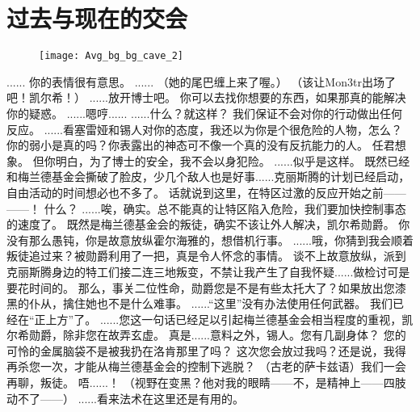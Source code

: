 \documentclass[openany]{book}
\begin{document}
\chapter{过去与现在的交会}
\begin{figure}[h]
    \centering
    \texttt{[image: Avg\_bg\_bg\_cave\_2]}
\end{figure}
\begin{dialogue}
     ......
     你的表情很有意思。
     ......
     （她的尾巴缠上来了喔。）
     （该让Mon3tr出场了吧！凯尔希！）
     ......放开博士吧。
     你可以去找你想要的东西，如果那真的能解决你的疑惑。
     ......嗯哼......
     ......什么？就这样？
     我们保证不会对你的行动做出任何反应。
     ......看塞雷娅和锡人对你的态度，我还以为你是个很危险的人物，怎么？
     你的弱小是真的吗？你表露出的神态可不像一个真的没有反抗能力的人。
     任君想象。
     但你明白，为了博士的安全，我不会以身犯险。
     ......似乎是这样。
     既然已经和梅兰德基金会撕破了脸皮，少几个敌人也是好事......克丽斯腾的计划已经启动，自由活动的时间想必也不多了。
     话就说到这里，在特区过激的反应开始之前——
     ——！
     什么？
     ......唉，确实。总不能真的让特区陷入危险，我们要加快控制事态的速度了。
     既然是梅兰德基金会的叛徒，确实不该让外人解决，凯尔希勋爵。
     你没有那么愚钝，你是故意放纵霍尔海雅的，想借机行事。
     ......哦，你猜到我会顺着叛徒追过来？被勋爵利用了一把，真是令人怀念的事情。
     谈不上故意放纵，派到克丽斯腾身边的特工们接二连三地叛变，不禁让我产生了自我怀疑......做检讨可是要花时间的。
     那么，事关二位性命，勋爵您是不是有些太托大了？如果放出您漆黑的仆从，擒住她也不是什么难事。
     ......“这里”没有办法使用任何武器。
     我们已经在“正上方”了。
     ......您这一句话已经足以引起梅兰德基金会相当程度的重视，凯尔希勋爵，除非您在故弄玄虚。
     真是......意料之外，锡人。您有几副身体？
     您的可怜的金属脑袋不是被我扔在洛肯那里了吗？
     这次您会放过我吗？还是说，我得再杀您一次，才能从梅兰德基金会的控制下逃脱？
     （古老的萨卡兹语）我们一会再聊，叛徒。
     唔......！
     （视野在变黑？他对我的眼睛——不，是精神上——四肢动不了——）
     ......看来法术在这里还是有用的。

\end{dialogue}
\end{document}
